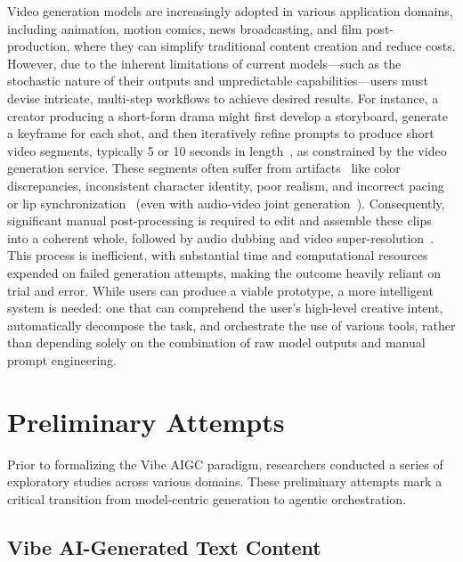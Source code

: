 \documentclass{article}
\begin{document}
Video generation models are increasingly adopted in various application domains, including animation, motion comics, news broadcasting, and film post-production, where they can simplify traditional content creation and reduce costs. However, due to the inherent limitations of current models—such as the stochastic nature of their outputs and unpredictable capabilities—users must devise intricate, multi-step workflows to achieve desired results. 
For instance, a creator producing a short-form drama might first develop a storyboard, generate a keyframe for each shot, and then iteratively refine prompts to produce short video segments, typically 5 or 10 seconds in length~\citep{wan2025wan,kong2024hunyuanvideo}, as constrained by the video generation service.
These segments often suffer from artifacts~\citep{ye2025realgen} like color discrepancies, inconsistent character identity, poor realism, and incorrect pacing or lip synchronization~\citep{hu2025harmony} (even with audio-video joint generation~\citep{huang2025jova}).
Consequently, significant manual post-processing is required to edit and assemble these clips into a coherent whole, followed by audio dubbing and video super-resolution~\citep{du2025unimmvsr}. This process is inefficient, with substantial time and computational resources expended on failed generation attempts, making the outcome heavily reliant on trial and error.
While users can produce a viable prototype, a more intelligent system is needed: one that can comprehend the user's high-level creative intent, automatically decompose the task, and orchestrate the use of various tools, rather than depending solely on the combination of raw model outputs and manual prompt engineering.

\section{Preliminary Attempts}
\label{attempts}
Prior to formalizing the {Vibe AIGC} paradigm, researchers conducted a series of exploratory studies across various domains. These preliminary attempts mark a critical transition from model-centric generation to agentic orchestration.

\subsection{Vibe AI-Generated Text Content}
\end{document}
